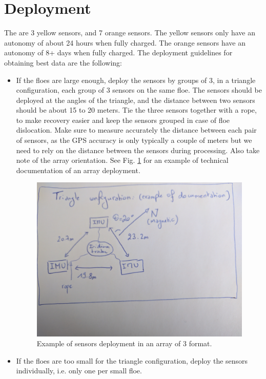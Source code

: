 \documentclass[pdftex,a4paper,12pt,twocolumn,fleqn,captions=tableheading]{scrartcl}
\begin{document}
\section{Deployment}

The are 3 yellow sensors, and 7 orange sensors. The yellow sensors only have an autonomy of about 24 hours when fully charged. The orange sensors have an autonomy of 8+ days when fully charged. The deployment guidelines for obtaining best data are the following:

\begin{itemize}
  \item If the floes are large enough, deploy the sensors by groups of 3, in a triangle configuration, each group of 3 sensors on the same floe. The sensors should be deployed at the angles of the triangle, and the distance between two sensors should be about 15 to 20 meters. Tie the three sensors together with a rope, to make recovery easier and keep the sensors grouped in case of floe dislocation. Make sure to measure accurately the distance between each pair of sensors, as the GPS accuracy is only typically a couple of meters but we need to rely on the distance between the sensors during processing. Also take note of the array orientation. See Fig. \ref{docEx3Sensors} for an example of technical documentation of an array deployment.

  \begin{figure}
  \begin{center}
  \includegraphics[width=.8\textwidth]{Figures/IMG_20170418_134237}
  \caption{\label{docEx3Sensors} Example of sensors deployment in an array of 3 format.}
  \end{center}
  \end{figure}

  \item If the floes are too small for the triangle configuration, deploy the sensors individually, i.e. only one per small floe.


\end{itemize}
\end{document}
